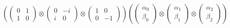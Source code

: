 \begin{align*}
& \left(
\begin{pmatrix}
0 & 1\\
1 & 0
\end{pmatrix}
\otimes
\begin{pmatrix}
0 & -i\\
i & 0
\end{pmatrix}
\otimes
\begin{pmatrix}
1 & 0\\
0 & -1
\end{pmatrix}
\right)
\left(
\begin{pmatrix}
\alpha_0\\
\beta_0
\end{pmatrix}
\otimes
\begin{pmatrix}
\alpha_1\\
\beta_1
\end{pmatrix}
\otimes
\begin{pmatrix}
\alpha_2\\
\beta_2
\end{pmatrix}
\right)\\

\end{align*}
